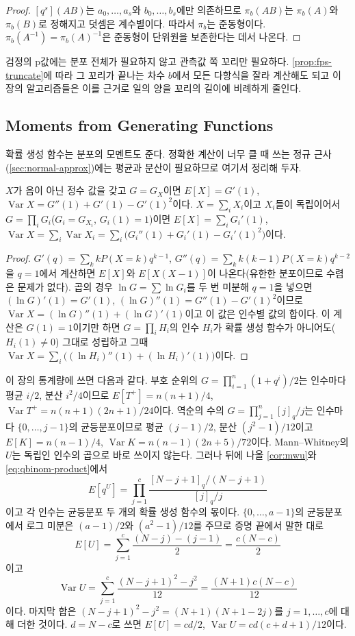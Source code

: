 \begin{proof}
$[q^s](AB)$는 $a_0,\dots,a_s$와 $b_0,\dots,b_s$에만 의존하므로 $\pi_b(AB)$는 $\pi_b(A)$와 $\pi_b(B)$로 정해지고 덧셈은 계수별이다. 따라서 $\pi_b$는 준동형이다. $\pi_b(A^{-1})=\pi_b(A)^{-1}$은 준동형이 단위원을 보존한다는 데서 나온다.
\end{proof}

검정의 p값에는 분포 전체가 필요하지 않고 관측값 쪽 꼬리만 필요하다. \cref{prop:fps-truncate}에 따라 그 꼬리가 끝나는 차수 $b$에서 모든 다항식을 잘라 계산해도 되고 이 장의 알고리즘들은 이를 근거로 일의 양을 꼬리의 길이에 비례하게 줄인다.

\subsection{Moments from Generating Functions}

확률 생성 함수는 분포의 모멘트도 준다. 정확한 계산이 너무 클 때 쓰는 정규 근사(\cref{sec:normal-approx})에는 평균과 분산이 필요하므로 여기서 정리해 두자.

\begin{proposition}
\label{prop:pgf-moments}
$X$가 음이 아닌 정수 값을 갖고 $G=G_X$이면 $E[X]=G'(1)$, $\operatorname{Var}X=G''(1)+G'(1)-G'(1)^2$이다. $X=\sum_iX_i$이고 $X_i$들이 독립이어서 $G=\prod_iG_i$($G_i=G_{X_i}$, $G_i(1)=1$)이면 $E[X]=\sum_iG_i'(1)$, $\operatorname{Var}X=\sum_i\operatorname{Var}X_i=\sum_i\bigl(G_i''(1)+G_i'(1)-G_i'(1)^2\bigr)$이다.
\end{proposition}

\begin{proof}
$G'(q)=\sum_kkP(X=k)q^{k-1}$, $G''(q)=\sum_kk(k-1)P(X=k)q^{k-2}$을 $q=1$에서 계산하면 $E[X]$와 $E[X(X-1)]$이 나온다(유한한 분포이므로 수렴은 문제가 없다). 곱의 경우 $\ln G=\sum\ln G_i$를 두 번 미분해 $q=1$을 넣으면 $(\ln G)'(1)=G'(1)$, $(\ln G)''(1)=G''(1)-G'(1)^2$이므로 $\operatorname{Var}X=(\ln G)''(1)+(\ln G)'(1)$이고 이 값은 인수별 값의 합이다. 이 계산은 $G(1)=1$이기만 하면 $G=\prod_iH_i$의 인수 $H_i$가 확률 생성 함수가 아니어도($H_i(1)\ne0$) 그대로 성립하고 그때 $\operatorname{Var}X=\sum_i\bigl((\ln H_i)''(1)+(\ln H_i)'(1)\bigr)$이다.
\end{proof}

이 장의 통계량에 쓰면 다음과 같다. 부호 순위의 $G=\prod_{i=1}^n(1+q^i)/2$는 인수마다 평균 $i/2$, 분산 $i^2/4$이므로 $E[T^+]=n(n+1)/4$, $\operatorname{Var}T^+=n(n+1)(2n+1)/24$이다. 역순의 수의 $G=\prod_{j=1}^n[j]_q/j$는 인수마다 $\{0,\dots,j-1\}$의 균등분포이므로 평균 $(j-1)/2$, 분산 $(j^2-1)/12$이고 $E[K]=n(n-1)/4$, $\operatorname{Var}K=n(n-1)(2n+5)/72$이다. Mann--Whitney의 $U$는 독립인 인수의 곱으로 바로 쓰이지 않는다. 그러나 뒤에 나올 \cref{cor:mwu}와 \cref{eq:qbinom-product}에서
\[
E[q^U]=\prod_{j=1}^c\frac{[N-j+1]_q/(N-j+1)}{[j]_q/j}
\]
이고 각 인수는 균등분포 두 개의 확률 생성 함수의 몫이다. $\{0,\dots,a-1\}$의 균등분포에서 로그 미분은 $(a-1)/2$와 $(a^2-1)/12$를 주므로 증명 끝에서 말한 대로
\[
E[U]=\sum_{j=1}^c\frac{(N-j)-(j-1)}2=\frac{c(N-c)}2
\]
이고
\[
\operatorname{Var}U=\sum_{j=1}^c\frac{(N-j+1)^2-j^2}{12}=\frac{(N+1)c(N-c)}{12}
\]
이다. 마지막 합은 $(N-j+1)^2-j^2=(N+1)(N+1-2j)$를 $j=1,\dots,c$에 대해 더한 것이다. $d=N-c$로 쓰면 $E[U]=cd/2$, $\operatorname{Var}U=cd(c+d+1)/12$이다.

